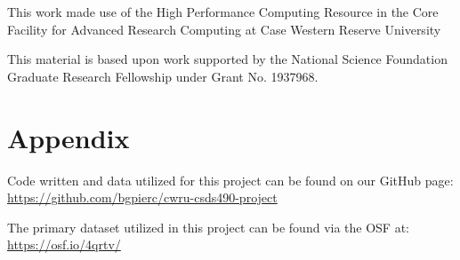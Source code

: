\documentclass[conference]{IEEEtran}
\begin{document}
This work made use of the High Performance Computing Resource in the Core Facility for Advanced Research Computing at Case Western Reserve University

This material is based upon work supported by the National Science Foundation Graduate Research Fellowship under Grant No. 1937968.

\section{Appendix}
Code written and data utilized for this project can be found on our GitHub page: \href{https://github.com/bgpierc/cwru-csds490-project}{https://github.com/bgpierc/cwru-csds490-project}

The primary dataset utilized in this project can be found via the OSF at: \href{https://osf.io/4qrtv/}{https://osf.io/4qrtv/}

\end{document}
